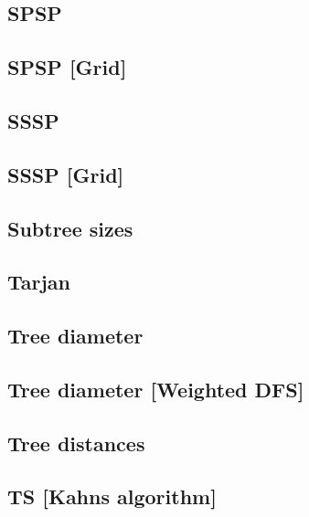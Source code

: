 \subsection{SPSP}
\raggedbottom
\hrulefill
\subsection{SPSP [Grid]}
\raggedbottom
\hrulefill
\subsection{SSSP}
\raggedbottom
\hrulefill
\subsection{SSSP [Grid]}
\raggedbottom
\hrulefill
\subsection{Subtree sizes}
\raggedbottom
\hrulefill
\subsection{Tarjan}
\raggedbottom
\hrulefill
\subsection{Tree diameter}
\raggedbottom
\hrulefill
\subsection{Tree diameter [Weighted DFS]}
\raggedbottom
\hrulefill
\subsection{Tree distances}
\raggedbottom
\hrulefill
\subsection{TS [Kahns algorithm]}
\raggedbottom
\hrulefill


